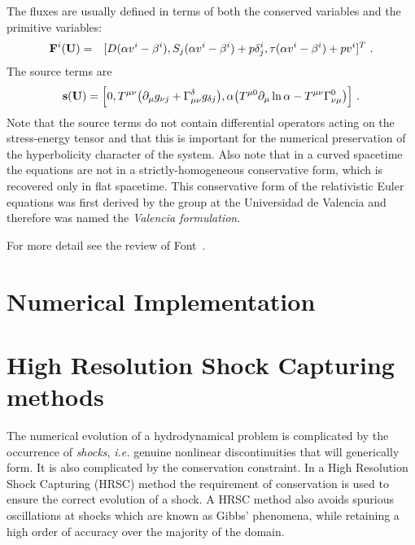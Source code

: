 \documentclass{article}
\begin{document}
The fluxes are usually defined in terms of both the conserved
variables and the primitive variables:
%
\begin{eqnarray}
{\bf F}^i({\bf U}) &=& [D(\alpha v^i - \beta^i), S_j(\alpha v^i -
  \beta^i) + p\delta^i_j, \tau(\alpha v^i - \beta^i) + p
  v^i]^T\ .
\end{eqnarray}
%
The source terms are
%
\begin{eqnarray} \label{source_terms}
{\bf s}({\bf U}) = \Big [0, T^{\mu\nu}\big (\partial_\mu g_{\nu j} +
  \Gamma^\delta_{\mu\nu} g_{\delta j}\big ), \alpha \big (T^{\mu
    0}\partial_\mu \ln \alpha - T^{\mu\nu}\Gamma^0_{\nu\mu} \big) \Big ]\ .
\end{eqnarray}
%
Note that the source terms do not contain differential operators
acting on the stress-energy tensor and that this is important for the
numerical preservation of the hyperbolicity character of the system.
Also note that in a curved spacetime the equations are not in a
strictly-homogeneous conservative form, which is recovered only in flat
spacetime. This conservative form of the relativistic Euler equations
was first derived by the group at the Universidad de Valencia
\cite{Banyuls97} and therefore was named the {\it Valencia
formulation}. 




For more detail see the review of Font~\cite{livrevgrrfd}. 

\section{Numerical Implementation}

\section{High Resolution Shock Capturing methods}
\label{sec:hrsc}

The numerical evolution of a hydrodynamical problem is complicated by
the occurrence of {\it shocks}, {\it i.e.} genuine nonlinear discontinuities that
will generically form. It is also complicated by the conservation
constraint. In a High Resolution Shock Capturing (HRSC) method the
requirement of conservation is used to ensure the correct evolution of
a shock. A HRSC method also avoids spurious oscillations at shocks
which are known as Gibbs' phenomena, while retaining a high order of
accuracy over the majority of the domain.
\end{document}
